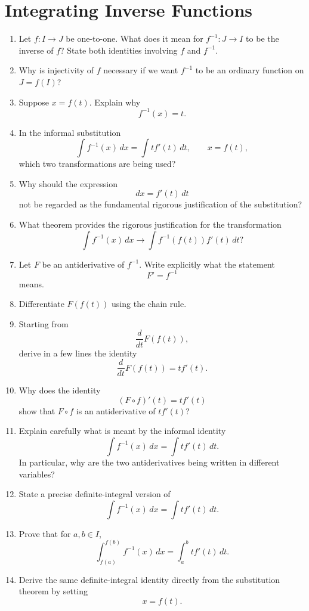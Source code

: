 \section{Integrating Inverse Functions}

\begin{enumerate}
  \item Let \(f:I\to J\) be one-to-one. What does it mean for \(f^{-1}:J\to I\) to be the inverse of \(f\)? State both identities involving \(f\) and \(f^{-1}\).
  \item Why is injectivity of \(f\) necessary if we want \(f^{-1}\) to be an ordinary function on \(J=f(I)\)?
  \item Suppose \(x=f(t)\). Explain why
    \[ f^{-1}(x)=t. \]
  \item In the informal substitution
    \[ \int f^{-1}(x)\,dx = \int t f'(t)\,dt, \qquad x=f(t), \]
    which two transformations are being used?
  \item Why should the expression
    \[ dx=f'(t)\,dt \]
    not be regarded as the fundamental rigorous justification of the substitution?
  \item What theorem provides the rigorous justification for the transformation
    \[ \int f^{-1}(x)\,dx \longrightarrow \int f^{-1}(f(t))f'(t)\,dt? \]
  \item Let \(F\) be an antiderivative of \(f^{-1}\). Write explicitly what the statement
    \[ F'=f^{-1} \]
    means.
  \item Differentiate \(F(f(t))\) using the chain rule.
  \item Starting from
    \[ \frac{d}{dt}F(f(t)), \]
    derive in a few lines the identity
    \[ \frac{d}{dt}F(f(t))=t f'(t). \]
  \item Why does the identity
    \[ (F\circ f)'(t)=t f'(t) \]
    show that \(F\circ f\) is an antiderivative of \(t f'(t)\)?
  \item Explain carefully what is meant by the informal identity
    \[ \int f^{-1}(x)\,dx = \int t f'(t)\,dt. \]
    In particular, why are the two antiderivatives being written in different variables?
  \item State a precise definite-integral version of
    \[ \int f^{-1}(x)\,dx = \int t f'(t)\,dt. \]
  \item Prove that for \(a,b\in I\),
    \[ \int_{f(a)}^{f(b)}f^{-1}(x)\,dx = \int_{a}^{b} t f'(t)\,dt. \]
  \item Derive the same definite-integral identity directly from the substitution theorem by setting
    \[ x=f(t). \]

\end{enumerate}
